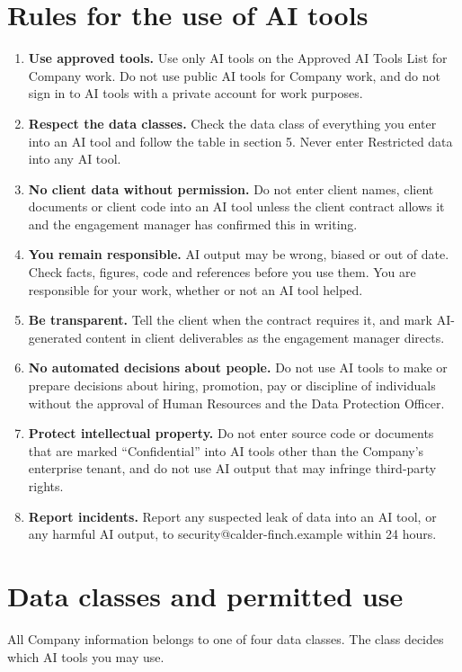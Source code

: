 \documentclass[10.5pt,a4paper]{article}
\begin{document}
\section{Rules for the use of AI tools}
\begin{enumerate}[label=\textbf{4.\arabic*}, leftmargin=2.6em, itemsep=0.4em]
  \item \textbf{Use approved tools.} Use only AI tools on the Approved AI Tools List for Company work. Do not use public AI
        tools for Company work, and do not sign in to AI tools with a private account for work purposes.
  \item \textbf{Respect the data classes.} Check the data class of everything you enter into an AI tool and follow the
        table in section 5. Never enter Restricted data into any AI tool.
  \item \textbf{No client data without permission.} Do not enter client names, client documents or client code into an AI
        tool unless the client contract allows it and the engagement manager has confirmed this in writing.
  \item \textbf{You remain responsible.} AI output may be wrong, biased or out of date. Check facts, figures, code and
        references before you use them. You are responsible for your work, whether or not an AI tool helped.
  \item \textbf{Be transparent.} Tell the client when the contract requires it, and mark AI-generated content in client
        deliverables as the engagement manager directs.
  \item \textbf{No automated decisions about people.} Do not use AI tools to make or prepare decisions about hiring,
        promotion, pay or discipline of individuals without the approval of Human Resources and the Data Protection Officer.
  \item \textbf{Protect intellectual property.} Do not enter source code or documents that are marked ``Confidential'' into
        AI tools other than the Company's enterprise tenant, and do not use AI output that may infringe third-party rights.
  \item \textbf{Report incidents.} Report any suspected leak of data into an AI tool, or any harmful AI output, to
        security@calder-finch.example within 24 hours.
\end{enumerate}

\section{Data classes and permitted use}
All Company information belongs to one of four data classes. The class decides which AI tools you may use.
\end{document}
